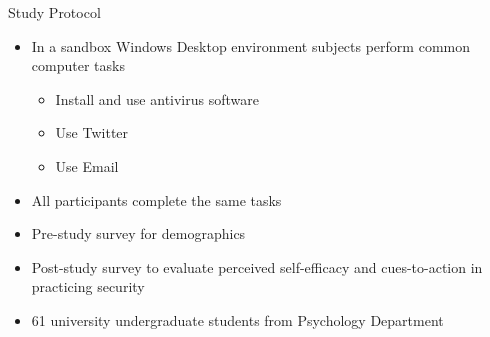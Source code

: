 \begin{frame} {Study Protocol}
\begin{itemize}
\item In a sandbox Windows Desktop environment subjects perform common computer tasks
\begin{itemize}
\item Install and use antivirus software
\item Use Twitter
\item Use Email
\end{itemize}
\item All participants complete the same tasks
\item Pre-study survey for demographics
\item Post-study survey to evaluate perceived self-efficacy and cues-to-action in practicing security
\item 61 university undergraduate students from Psychology Department
\end{itemize}
\end{frame}